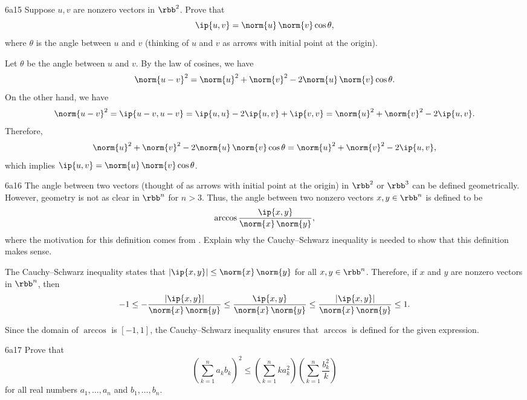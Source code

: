 \begin{exercise}{6a15}
    Suppose $u, v$ are nonzero vectors in $\rbb^2$.
    Prove that
    \[
        \ip{u, v} = \norm{u}\, \norm{v} \cos\theta,
    \]
    where $\theta$ is the angle between $u$ and $v$ (thinking of $u$ and $v$ as arrows with initial point at the origin).

\end{exercise}

\begin{sol}
    Let $\theta$ be the angle between $u$ and $v$.
    By the law of cosines, we have
    \[
        \norm{u - v}^2 = \norm{u}^2 + \norm{v}^2 - 2\norm{u}\,\norm{v}\cos\theta.
    \]
    On the other hand, we have
    \[
        \norm{u - v}^2 = \ip{u - v, u - v} = \ip{u, u} - 2\ip{u, v} + \ip{v, v} = \norm{u}^2 + \norm{v}^2 - 2\ip{u, v}.
    \]
    Therefore,
    \[
        \norm{u}^2 + \norm{v}^2 - 2\norm{u}\,\norm{v}\cos\theta = \norm{u}^2 + \norm{v}^2 - 2\ip{u, v},
    \]
    which implies $\ip{u, v} = \norm{u}\,\norm{v}\cos\theta$.
\end{sol}

\begin{exercise}{6a16}
    The angle between two vectors (thought of as arrows with initial point at the origin) in $\rbb^2$ or $\rbb^3$ can be defined geometrically.
    However, geometry is not as clear in $\rbb^n$ for $n > 3$.
    Thus, the angle between two nonzero vectors $x, y \in \rbb^n$ is defined to be
    \[
        \arccos \frac{\ip{x, y}}{\norm{x}\, \norm{y}},
    \]
    where the motivation for this definition comes from .
    Explain why the Cauchy--Schwarz inequality is needed to show that this definition makes sense.
\end{exercise}

\begin{sol}
    The Cauchy--Schwarz inequality states that $|\ip{x, y}| \leq \norm{x}\,\norm{y}$ for all $x, y \in \rbb^n$.
    Therefore, if $x$ and $y$ are nonzero vectors in $\rbb^n$, then
    \[
        -1 \leq -\frac{|\ip{x, y}|}{\norm{x}\,\norm{y}} \leq \frac{\ip{x, y}}{\norm{x}\,\norm{y}} \leq \frac{|\ip{x, y}|}{\norm{x}\,\norm{y}} \leq 1.
    \]

    Since the domain of $\arccos$ is $[-1, 1]$, the Cauchy--Schwarz inequality ensures that $\arccos$ is defined for the given expression.
\end{sol}

\begin{exercise}{6a17}
    Prove that
    \[
        \left(\sum_{k=1}^{n} a_k b_k\right)^2 \leq \left(\sum_{k=1}^{n} k a_k^2\right)\left(\sum_{k=1}^{n} \frac{b_k^2}{k}\right)
    \]
    for all real numbers $a_1, \ldots, a_n$ and $b_1, \ldots, b_n$.
\end{exercise}

